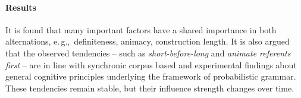 \documentclass[a4paper,12pt]{article}
\newcommand{\eg}{e.\,g.,\ }
\begin{document}
\begin{mdframed}
  \paragraph{Results}

  It is found that many important factors have a shared importance in both alternations, \eg definiteness, animacy, construction length.
  It is also argued that the observed tendencies -- such as \textit{short-before-long} and \textit{animate referents first} -- are in line with synchronic corpus based and experimental findings about general cognitive principles underlying the framework of probabilistic grammar.
  These tendencies remain stable, but their influence strength changes over time.

\end{mdframed}

\vspace{2\baselineskip}
\end{document}
